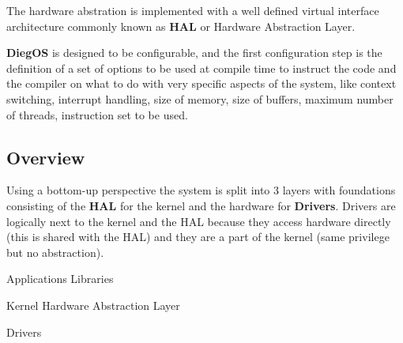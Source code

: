 \documentclass[11pt,b5paper]{scrbook}
\newcommand{\myOS}{{\color{SteelBlue}\textbf{DiegOS}}}
\begin{document}
The hardware abstration is implemented with a well defined virtual interface
architecture commonly known as \textbf{HAL} or Hardware Abstraction Layer.

{\myOS} is designed to be configurable, and the
first configuration step is
the definition of a set of options to be used at compile time to instruct the code and
the compiler on what to do with very specific aspects of the system, like
context switching, interrupt handling, size of memory, size of buffers,
maximum number of threads, instruction set to be used.

\subsection{Overview}
Using a bottom-up perspective the system is split into 3 layers with foundations consisting of
the \textbf{HAL} for the kernel and the hardware for \textbf{Drivers}.
Drivers are logically next to the kernel and the HAL because they access hardware directly
(this is shared with the HAL) and they are a part of the kernel (same privilege but no abstraction).
\hfill

\begin{tcolorbox}[enhanced,adjusted title=Hardware,drop fuzzy shadow]
    \begin{tcbitemize}[
        raster columns=3,
	raster rows=4,
        raster column skip=5mm,
        raster row skip=5mm,
	raster equal height=rows,
        halign=center]
        
        \tcbitem[
		raster multicolumn=3,
		colback=lightgray!90!green,
		colframe=green!50!black,
		enhanced,
		adjusted title=Layer 3,
		halign title=center,
		drop fuzzy shadow]
            Applications
        \tcbitem[
		raster multicolumn=3,
		colback=lightgray!90!yellow,
		colframe=yellow!80!darkgray,
		enhanced,
		adjusted title=Layer 2,
		halign title=center,
		drop fuzzy shadow]
            Libraries
	\tcbitem[raster multirow=2,raster multicolumn=2,blankest]
		\begin{tcbitemize}[raster columns=2,raster rows=2]
	        \tcbitem[
			raster multicolumn=2,
			colback=lightgray!90!cyan,
			colframe=cyan!40!darkgray,
			enhanced,
			adjusted title=Layer 1,
			halign title=center,
			drop fuzzy shadow]
	            Kernel
		 \tcbitem[
			raster multicolumn=2,
			colback=lightgray!90!red,
			colframe=red!60!gray,
			enhanced,
			adjusted title=HAL,
			halign title=center,
			drop fuzzy shadow]
	            Hardware Abstraction Layer
		\end{tcbitemize}

        	\tcbitem[
			colback=lightgray!90!violet,
			colframe=violet!50!black,
			enhanced,
			adjusted title=Layer 1a,
			halign title=center,
			drop fuzzy shadow]
	            Drivers
   \end{tcbitemize}
\end{tcolorbox}
\hfill
\end{document}
